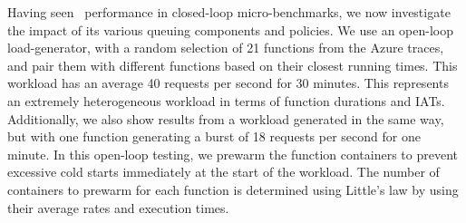 Having seen \sysname~performance in closed-loop micro-benchmarks, we now investigate the impact of its various queuing components and policies.
We use an open-loop load-generator, with a random selection of 21 functions from the Azure traces, and pair them with different functions based on their closest running times.
This  workload has an average 40 requests per second for 30 minutes. 
This represents an extremely heterogeneous workload in terms of function durations and IATs.
Additionally, we also show results from a  workload generated in the same way, but with one function generating a burst of 18 requests per second for one minute.
In this open-loop testing, we prewarm the function containers to prevent excessive cold starts immediately at the start of the workload.
The number of containers to prewarm for each function is determined using Little's law by using their average rates and execution times. 

